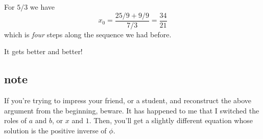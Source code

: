 \documentclass[11pt, oneside]{article}
\begin{document}
For $5/3$ we have
\[ x_0 =  \frac{25/9 + 9/9}{7/3} = \frac{34}{21} \]
which is \emph{four} steps along the sequence we had before.

It gets better and better!

\subsection*{note}

If you're trying to impress your friend, or a student, and reconstruct the above argument from the beginning, beware.  It has happened to me that I switched the roles of $a$ and $b$, or $x$ and $1$.  Then, you'll get a slightly different equation whose solution is the positive inverse of $\phi$.
\end{document}
